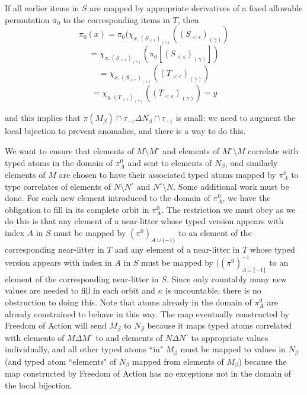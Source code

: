 \documentclass[112pt]{article}
\begin{document}
\begin{description}
If all earlier items in $S$ are mapped by appropriate derivatives of a fixed allowable permutation $\pi_0$ to the corresponding items in $T$, then
$$\pi_0(x) = \pi_0(\chi_{x,(S_{<\epsilon})_{(\gamma)}}((S_{<\epsilon})_{(\gamma)}) $$ $$ = \chi_{x,(S_{<\epsilon})_{(\gamma)}}(\pi_0[(S_{<\epsilon})_{(\gamma)}])$$ $$ = \chi_{x,(S_{<\epsilon})_{(\gamma)}}((T_{<\epsilon})_{(\gamma)}) $$ $$= \chi_{y,(T_{<\epsilon})_{(\gamma)}}((T_{<\epsilon})_{(\gamma)})=y$$

and this implies that $\pi(M_\beta)\cap \tau_{-1} \Delta N_\beta\cap \tau_{-1}$ is small:  we need to augment the local bijection to prevent anomalies, and there is a way to do this.

We want to ensure that elements of $M \setminus M^{\circ}$ and elements of $M^{\circ} \setminus M$ correlate with typed atoms in the domain of $\pi^0_A$ and sent to elements of $N_\beta$, and similarly elements of $M$ are chosen to have their associated typed atoms mapped by $\pi^0_A$ to type correlates of elements of $N\setminus N^\circ$ and $N^\circ \setminus N$.
 Some additional work must be done.  For each new element introduced to the domain of $\pi^0_A$, we have the obligation to fill in its complete orbit in $\pi^0_A$.   The restriction we must obey as we do this is that any element of a near-litter whose typed version appears with index $A$ in $S$ must be mapped by $(\pi^0)_{A\cup \{-1\}}$ to an element of the corresponding near-litter in $T$ and any element of a near-litter in $T$  whose typed version appears with index in $A$ in $S$ must be mapped by $((\pi^0)_{A\cup \{-1\}}^{-1}$ to an element of the corresponding near-litter in $S$.  Since only countably many new values are needed to fill in each orbit and $\kappa$ is uncountable, there is no obstruction to doing this.  Note that atoms already in the domain of $\pi^0_A$ are already constrained to behave in this way.  The map eventually constructed by Freedom of Action will send
$M_\beta$ to $N_\beta$ because it maps typed atoms correlated with elements of $M \Delta M^\circ$ to and elements of $N \Delta N^{\circ}$ to appropriate values individually, and all other typed atoms ``in" $M_\beta$ must be mapped to values in $N_\beta$ (and typed atom ``elements" of $N_\beta$ mapped from elements of $M_\beta$) because the map constructed by Freedom of Action has no exceptions not in the domain of the local bijection.


\end{description}
\end{document}
